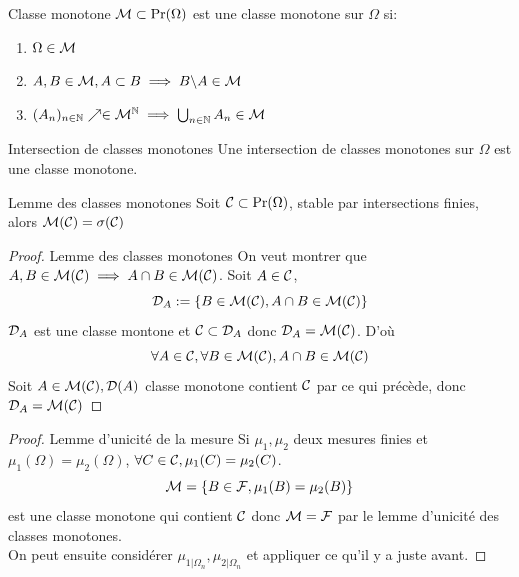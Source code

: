 \documentclass[]{report}
\begin{document}
\begin{df}{Classe monotone}{}
    $\mathcal{M} \subset \Pr(\Omega)$ est une classe monotone sur $\Omega$ si:
    \begin{enumerate}[label=\roman*]
        \item $\Omega \in \mathcal{M}$
        \item $A,B\in \mathcal{M},A\subset B\implies B\backslash A\in \mathcal{M}$
        \item $(A_n)_{n\in\mathbb{N}}\nearrow \in \mathcal{M}^{\mathbb{N}}\implies \bigcup_{{n\in\mathbb{N}}} A_n\in \mathcal{M}$
    \end{enumerate}
\end{df}

\begin{prop}{Intersection de classes monotones}{}
    Une intersection de classes monotones sur $\Omega$ est une classe monotone.
\end{prop}

\begin{lm}{Lemme des classes monotones}{}
    Soit $\mathcal{C}\subset \Pr(\Omega)$, stable par intersections finies, alors $\mathcal{M}(\mathcal{C})=\sigma(\mathcal{C})$
\end{lm}

\begin{proof}{Lemme des classes monotones}{}
    On veut montrer que $A,B\in \mathcal{M}(\mathcal{C})\implies A\cap B\in \mathcal{M}(\mathcal{C})$. Soit $A\in \mathcal{C}$,
    \[\mathcal{D}_A:=\{B\in \mathcal{M}(\mathcal{C}),A\cap B \in \mathcal{M}(\mathcal{C})\}\]
    $\mathcal{D}_A$ est une classe montone et $\mathcal{C}\subset \mathcal{D}_A$ donc $\mathcal{D}_A=\mathcal{M}(\mathcal{C})$. D'où
    \[\forall A\in \mathcal{C},\forall B\in \mathcal{M}(\mathcal{C}),A\cap B\in \mathcal{M}(\mathcal{C})\]
    Soit $A\in \mathcal{M}(\mathcal{C}),\mathcal{D}(A)$ classe monotone contient $\mathcal{C}$ par ce qui précède, donc $\mathcal{D}_A=\mathcal{M}(\mathcal{C})$
\end{proof}

\begin{proof}{Lemme d'unicité de la mesure}{}
    Si $\mu_1,\mu_2$ deux mesures finies et $\mu_1(\Omega)=\mu_2(\Omega)$, $\forall C\in \mathcal{C}, \mu_1(C)=\mu_2(C)$.
    \[\mathcal{M}=\{B\in \mathcal{F},\mu_1(B)=\mu_2(B)\}\]
    est une classe monotone qui contient $\mathcal{C}$ donc $\mathcal{M}= \mathcal{F}$ par le lemme d'unicité des classes monotones.\\
    On peut ensuite considérer $\mu_{1|\Omega_n},\mu_{2|\Omega_n}$ et appliquer ce qu'il y a juste avant.
\end{proof}
\end{document}
